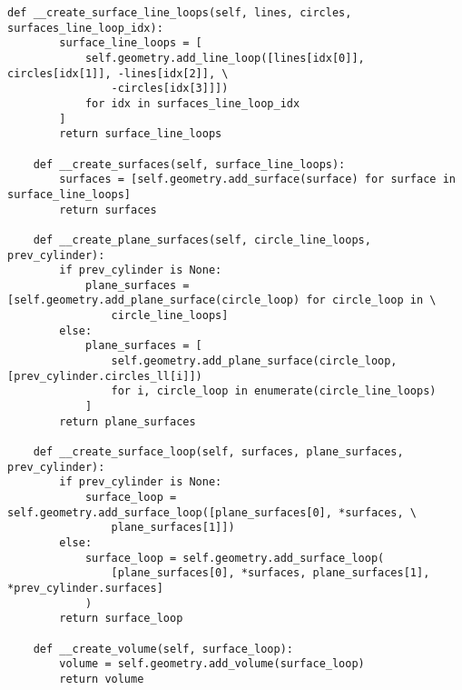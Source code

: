 \begin{lstlisting}[caption=Исходный код модуля генерации расчетной сетки и её маркировки, 
                    label={lst_meshgen_all}, basicstyle=\scriptsize]
    def __create_surface_line_loops(self, lines, circles, surfaces_line_loop_idx):
        surface_line_loops = [
            self.geometry.add_line_loop([lines[idx[0]], circles[idx[1]], -lines[idx[2]], \
                -circles[idx[3]]])
            for idx in surfaces_line_loop_idx
        ]
        return surface_line_loops

    def __create_surfaces(self, surface_line_loops):
        surfaces = [self.geometry.add_surface(surface) for surface in surface_line_loops]
        return surfaces

    def __create_plane_surfaces(self, circle_line_loops, prev_cylinder):
        if prev_cylinder is None:
            plane_surfaces = [self.geometry.add_plane_surface(circle_loop) for circle_loop in \
                circle_line_loops]
        else:
            plane_surfaces = [
                self.geometry.add_plane_surface(circle_loop, [prev_cylinder.circles_ll[i]])
                for i, circle_loop in enumerate(circle_line_loops)
            ]
        return plane_surfaces

    def __create_surface_loop(self, surfaces, plane_surfaces, prev_cylinder):
        if prev_cylinder is None:
            surface_loop = self.geometry.add_surface_loop([plane_surfaces[0], *surfaces, \
                plane_surfaces[1]])
        else:
            surface_loop = self.geometry.add_surface_loop(
                [plane_surfaces[0], *surfaces, plane_surfaces[1], *prev_cylinder.surfaces]
            )
        return surface_loop

    def __create_volume(self, surface_loop):
        volume = self.geometry.add_volume(surface_loop)
        return volume
\end{lstlisting}

\clearpage